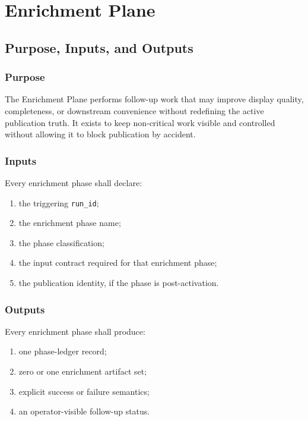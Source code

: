 \chapter{Enrichment Plane}
\section{Purpose, Inputs, and Outputs}

\subsection{Purpose}
The Enrichment Plane performs follow-up work that may improve display quality, completeness, or downstream convenience without redefining the active publication truth. It exists to keep non-critical work visible and controlled without allowing it to block publication by accident.

\subsection{Inputs}
Every enrichment phase shall declare:
\begin{enumerate}[leftmargin=1.2cm]
    \item the triggering \texttt{run\_id};
    \item the enrichment phase name;
    \item the phase classification;
    \item the input contract required for that enrichment phase;
    \item the publication identity, if the phase is post-activation.
\end{enumerate}

\subsection{Outputs}
Every enrichment phase shall produce:
\begin{enumerate}[leftmargin=1.2cm]
    \item one phase-ledger record;
    \item zero or one enrichment artifact set;
    \item explicit success or failure semantics;
    \item an operator-visible follow-up status.
\end{enumerate}

